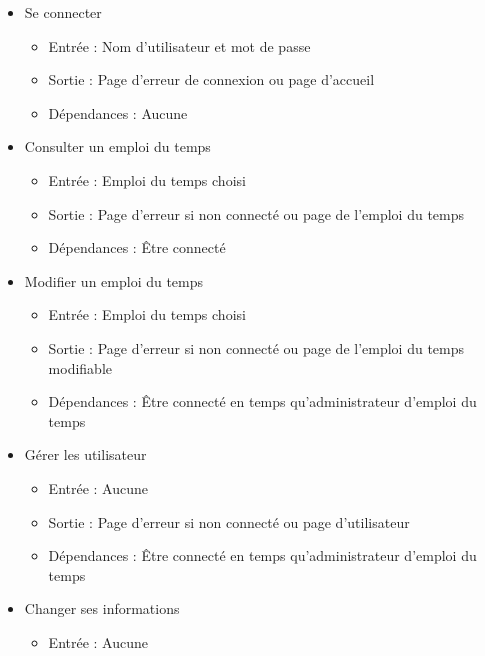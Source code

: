\documentclass[a4paper, 11pt]{article}
\begin{document}
	\begin{itemize}
		\item Se connecter
		\begin{itemize}
			\item Entrée : Nom d'utilisateur et mot de passe
			\item Sortie : Page d'erreur de connexion ou page d'accueil
			\item Dépendances : Aucune
		\end{itemize}
		\item Consulter un emploi du temps
		\begin{itemize}
			\item Entrée : Emploi du temps choisi
			\item Sortie : Page d'erreur si non connecté ou page de l'emploi du temps
			\item Dépendances : Être connecté
		\end{itemize}
		\item Modifier un emploi du temps
		\begin{itemize}
			\item Entrée : Emploi du temps choisi
			\item Sortie : Page d'erreur si non connecté ou page de l'emploi du temps modifiable
			\item Dépendances : Être connecté en temps qu'administrateur d'emploi du temps
		\end{itemize}
		\item Gérer les utilisateur
		\begin{itemize}
			\item Entrée : Aucune
			\item Sortie : Page d'erreur si non connecté ou page d'utilisateur
			\item Dépendances : Être connecté en temps qu'administrateur d'emploi du temps
		\end{itemize}
		\item Changer ses informations
		\begin{itemize}
			\item Entrée : Aucune

\end{itemize}
\end{itemize}
\end{document}
